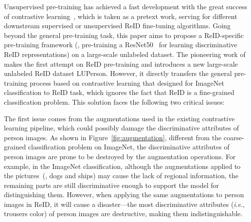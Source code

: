 \documentclass[10pt,twocolumn,letterpaper]{article}
\newcommand{\ieno}{\textit{i}.\textit{e}.}
\begin{document}


Unsupervised pre-training has achieved a fast development with the great success of contrastive learning~\cite{he2020momentum,chen2020improved,chen2020simple,chen2021exploring,caron2020unsupervised}, which is taken as a pretext work, serving for different downstream supervised or unsupervised ReID fine-tuning algorithms. Going beyond the general pre-training task, this paper aims to propose a ReID-specific pre-training framework (\eg, pre-training a ResNet50~\cite{he2016deep} for learning discriminative ReID representations) on a large-scale unlabeled dataset. The pioneering work of~\cite{fu2021unsupervised} makes the first attempt on ReID pre-training and introduces a new large-scale unlabeled ReID dataset LUPerson. However, it directly transfers the general pre-training process based on contrastive learning that designed for ImageNet classification to ReID task, which ignores the fact that ReID is a fine-grained classification problem. This solution faces the following two critical issues:


The first issue comes from the augmentations used in the existing contrastive learning pipeline, which could possibly damage the discriminative attributes of person images. As shown in Figure~\ref{fig:augmentation}, different from the coarse-grained classification problem on ImageNet, the discriminative attributes of person images are prone to be destroyed by the augmentation operations. For example, in the ImageNet classification, although the augmentations applied to the pictures~(\eg, dogs and ships) may cause the lack of regional information, the remaining parts are still discriminative enough to support the model for distinguishing them. 
However, when applying the same augmentations to person images in ReID, it will cause a disaster---the most discriminative attributes (\ieno, trousers color) of person images are destructive, making them indistinguishable.


\end{document}
